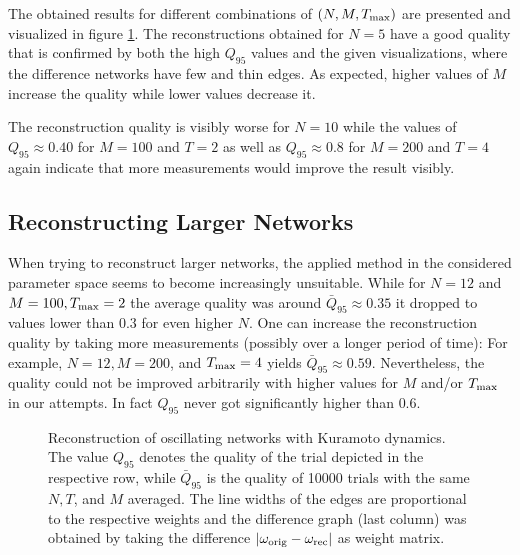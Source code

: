 \documentclass{scrartcl}
\begin{document}
The obtained results for different combinations of $(N, M, T_{\mathrm{max}})$ are
presented and visualized in figure \ref{fig:D211}. The reconstructions
obtained for $N = 5$ have a good quality that is confirmed by both the high
$Q_{95}$ values and the given visualizations, where the difference networks
have few and thin edges. As expected, higher values of $M$ increase the
quality while lower values decrease it.

The reconstruction quality is visibly worse for $N = 10$ while the values
of $Q_{95} \approx 0.40$ for $M = 100$ and $T = 2$ as well as
$Q_{95}\approx 0.8$ for $M = 200$ and $T = 4$ again indicate that more
measurements would improve the result visibly.


\subsection{Reconstructing Larger Networks}
When trying to reconstruct larger networks, the applied method in the
considered parameter space seems to become increasingly unsuitable. While
for $N=12$ and  $M = 100, T_{\mathrm{max}} = 2$ the average quality was around
$\bar{Q}_{95}\approx 0.35$ it dropped to values lower than $0.3$ for even
higher $N$.
One can increase the reconstruction quality by taking more measurements
(possibly over a longer period of time): For example, $N=12, M=200$, and
$T_{\mathrm{max}}=4$ yields $\bar{Q}_{95}\approx 0.59$. Nevertheless, the quality
could not be improved arbitrarily with higher values for $M$ and/or
$T_{\mathrm{max}}$ in our attempts. In fact $Q_{95}$ never got significantly
higher than $0.6$.  



\begin{figure}
    \centering
    \def\svgwidth{0.75\textwidth}
    
    \caption{Reconstruction of oscillating networks with Kuramoto dynamics. The
        value $Q_{95}$ denotes the quality of the trial depicted in the
        respective row, while $\bar{Q}_{95}$ is the quality of 10000
        trials with the same $N, T$, and $M$ averaged. The line widths of
        the edges are proportional to the respective weights and the
        difference graph (last column) was obtained by taking the
        difference $|\omega_{\mathrm{orig}} - \omega_{\mathrm{rec}}|$ as weight matrix.}
    \label{fig:D211}
\end{figure}


\end{document}
